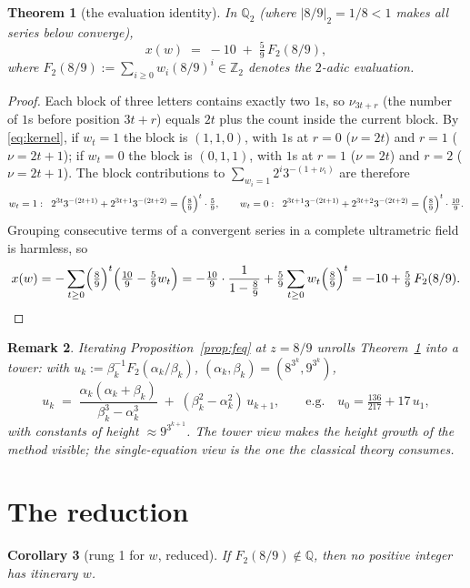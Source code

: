 \documentclass[11pt]{article}
\newtheorem{theorem}{Theorem}[section]
\newtheorem{corollary}[theorem]{Corollary}
\newtheorem{remark}[theorem]{Remark}
\theoremstyle{definition}
\newcommand{\Z}{\mathbb{Z}}
\newcommand{\Q}{\mathbb{Q}}
\newcommand{\Ztwo}{\Z_2}
\newcommand{\Qtwo}{\Q_2}
\begin{document}
\begin{theorem}[the evaluation identity]\label{thm:eval}
In $\Qtwo$ (where $|8/9|_2 = 1/8 < 1$ makes all series below
converge),
\[
x(w) \;=\; -10 \;+\; \tfrac{5}{9}\, F_2(8/9),
\]
where $F_2(8/9) := \sum_{i \ge 0} w_i (8/9)^i \in \Ztwo$ denotes the
$2$-adic evaluation.
\end{theorem}

\begin{proof}
Each block of three letters contains exactly two $1$s, so
$\nu_{3t+r}$ (the number of $1$s before position $3t + r$) equals
$2t$ plus the count inside the current block. By \eqref{eq:kernel},
if $w_t = 1$ the block is $(1,1,0)$, with $1$s at $r = 0$
($\nu = 2t$) and $r = 1$ ($\nu = 2t + 1$); if $w_t = 0$ the block is
$(0,1,1)$, with $1$s at $r = 1$ ($\nu = 2t$) and $r = 2$
($\nu = 2t + 1$). The block contributions to
$\sum_{w_i = 1} 2^i 3^{-(1+\nu_i)}$ are therefore
\[
w_t = 1:\;\; 2^{3t} 3^{-(2t+1)} + 2^{3t+1} 3^{-(2t+2)}
  = \Bigl(\tfrac{8}{9}\Bigr)^{t} \cdot \tfrac{5}{9}, \qquad
w_t = 0:\;\; 2^{3t+1} 3^{-(2t+1)} + 2^{3t+2} 3^{-(2t+2)}
  = \Bigl(\tfrac{8}{9}\Bigr)^{t} \cdot \tfrac{10}{9}.
\]
Grouping consecutive terms of a convergent series in a complete
ultrametric field is harmless, so
\[
x(w) = -\sum_{t \ge 0} \Bigl(\tfrac{8}{9}\Bigr)^{t}
  \Bigl(\tfrac{10}{9} - \tfrac{5}{9} w_t\Bigr)
  = -\tfrac{10}{9} \cdot \frac{1}{1 - \tfrac89}
    + \tfrac{5}{9} \sum_{t\ge0} w_t \Bigl(\tfrac{8}{9}\Bigr)^{t}
  = -10 + \tfrac59\, F_2(8/9). \qedhere
\]
\end{proof}

\begin{remark}
Iterating Proposition~\ref{prop:feq} at $z = 8/9$ unrolls
Theorem~\ref{thm:eval} into a tower: with
$u_k := \beta_k^{-1} F_2(\alpha_k/\beta_k)$,
$(\alpha_k, \beta_k) = (8^{3^k}\!, 9^{3^k})$,
\[
u_k \;=\; \frac{\alpha_k(\alpha_k + \beta_k)}{\beta_k^3 - \alpha_k^3}
\;+\; (\beta_k^2 - \alpha_k^2)\, u_{k+1},
\qquad\text{e.g.}\quad u_0 = \tfrac{136}{217} + 17\, u_1,
\]
with constants of height $\approx 9^{3^{k+1}}$. The tower view makes
the height growth of the method visible; the single-equation view is
the one the classical theory consumes.
\end{remark}

\section{The reduction}\label{sec:reduction}

\begin{corollary}[rung 1 for $w$, reduced]\label{cor:reduction}
If $F_2(8/9) \notin \Q$, then no positive integer has itinerary $w$.
\end{corollary}
\end{document}
